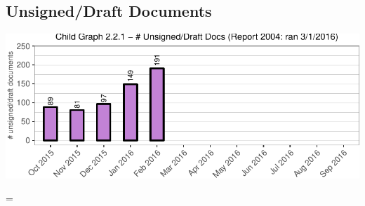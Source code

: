 \documentclass{article}\usepackage[]{graphicx}\usepackage[]{color}
\makeatletter
\def\maxwidth{ %
  \ifdim\Gin@nat@width>\linewidth
    \linewidth
  \else
    \Gin@nat@width
  \fi
}
\newenvironment{knitrout}{}{} %
\newenvironment{absolutelynopagebreak}
  {\par\nobreak\vfil\penalty0\vfilneg
   \vtop\bgroup}
  {\par\xdef\tpd{\the\prevdepth}\egroup
   \prevdepth=\tpd}
\makeatother
\begin{document}
\begin{absolutelynopagebreak}
\subsection{Unsigned/Draft Documents}
\begin{knitrout}
\color{fgcolor}
\includegraphics[width=\maxwidth]{figure/child_p_unsign-1} 

\end{knitrout}
\end{absolutelynopagebreak}



\end{document}
